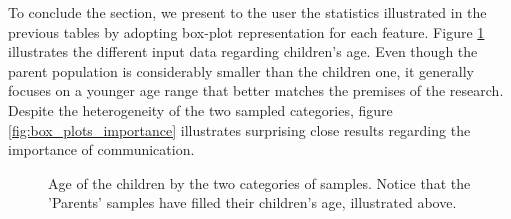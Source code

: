 To conclude the section, we present to the user the statistics illustrated in the previous tables by adopting box-plot representation for each feature. Figure \ref{fig:box_plots_child_age} illustrates the different input data regarding children's age. Even though the parent population is considerably smaller than the children one, it generally focuses on a younger age range that better matches the premises of the research. Despite the heterogeneity of the two sampled categories, figure \ref{fig:box_plots_importance} illustrates surprising close results regarding the importance of communication.

\begin{figure}[H]
    \centering
    \caption{Age of the children by the two categories of samples. Notice that the 'Parents' samples have filled their children's age, illustrated above.}
    \label{fig:box_plots_child_age}
\end{figure}

